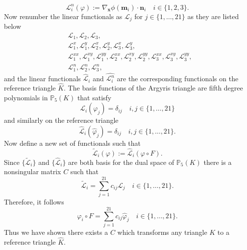 \begin{equation*}
  \mathcal{L}_i^n(\varphi) := \nabla_{\mathbf{x}} \phi(\mathbf{m}_i) \cdot
  \mathbf{n}_i \quad i\in\{1,2,3\}.
\end{equation*}
Now renumber the linear functionals as $\mathcal{L}_j$ for
$j\in\{1,\dots,21\}$ as they are listed below
\begin{align*}
  &\mathcal{L}_1, \mathcal{L}_2, \mathcal{L}_3, \\
  &\mathcal{L}_1^x, \mathcal{L}_1^y, \mathcal{L}_2^x, \mathcal{L}_2^y,
    \mathcal{L}_3^x, \mathcal{L}_3^y, \\
  &\mathcal{L}_1^{xx}, \mathcal{L}_1^{xy}, \mathcal{L}_1^{yy},
    \mathcal{L}_2^{xx}, \mathcal{L}_2^{xy}, \mathcal{L}_2^{yy},
    \mathcal{L}_3^{xx}, \mathcal{L}_3^{xy}, \mathcal{L}_3^{yy}, \\
  &\mathcal{L}_1^n, \mathcal{L}_2^n, \mathcal{L}_3^n,
\end{align*}
and the linear functionals $\hat{\mathcal{L}}_i$ and $\hat{ \mathcal{L}_i^n}$
are the corresponding functionals on the reference triangle $\hat{K}$. The basis
functions of the Argyris triangle are fifth degree polynomials in
$\mathbb{P}_5(K)$
that satisfy
\begin{equation*}
  \mathcal{L}_i(\varphi_j) = \delta_{ij} \quad i,j\in\{1,\dots,21\}
\end{equation*}
and similarly on the reference triangle
\begin{equation*}
  \hat{\mathcal{L}}_i(\hat{\varphi}_j) = \delta_{ij} \quad
  i,j\in\{1,\dots,21\}.
\end{equation*}
Now define a new set of functionals such that
\begin{equation}
  \tilde{\mathcal{L}}_i(\varphi) := \hat{\mathcal{L}}_i(\varphi\circ F).
  \label{eqn:Functional}
\end{equation}
Since $\{\tilde{\mathcal{L}}_i\}$ and $\{\hat{\mathcal{L}}_i\}$ are both basis
for the dual space of $\mathbb{P}_5(K)$ there is a nonsingular matrix $C$ such
that
\begin{equation}
  \tilde{\mathcal{L}}_i = \sum_{j=1}^{21} c_{ij} \mathcal{L}_j \quad i\in
  \{1,\dots,21\}.
  \label{eqn:FunctionalsC}
\end{equation}
Therefore, it follows \cite{Dominguez08}
\begin{equation}
  \varphi_i\circ F = \sum_{j=1}^{21} c_{ij}\hat{\varphi}_j \quad i\in
  \{1,\dots,21\}.
  \label{eqn:PolyC}
\end{equation}
Thus we have shown there exists a $C$ which transforms any triangle $K$ to a
reference triangle $\hat{K}$.

